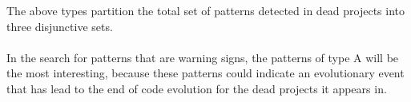 \vspace{1em}
\noindent
The above types partition the total set of patterns detected in dead projects
into three disjunctive sets.

\paragraph{}
In the search for patterns that are warning signs, the patterns of type A will
be the most interesting, because these patterns could indicate an evolutionary
event that has lead to the end of code evolution for the dead projects it
appears in.

\begin{comment}
- Execution of the research
- Phases, steps

This chapter reports on the execution of the research method as described in Chapter 3.

If the research has been divided into phases (e.g., using sub questions) the
phases are introduced, reported on and concluded individually. If needed this
Chapter could be split up to balance out the sizes of all Chapters.
An example Research Chapter is provided as Chapter 3 at Paul’s home
page\footnote{http://homepages.cwi.nl/~paulk/thesesMasterSoftwareEngineering/2006/ReneWiegers.pdf}.
\end{comment}
